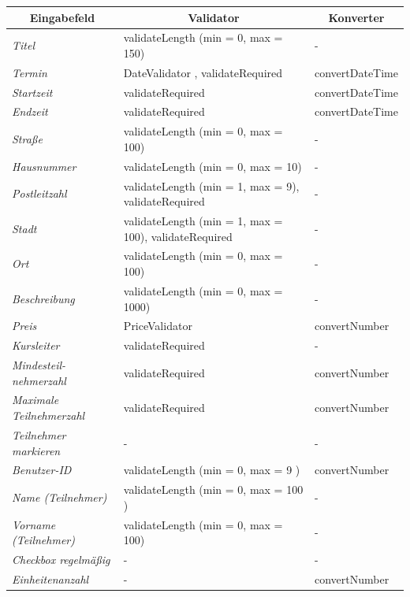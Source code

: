 \begin{itemize}
\begin{center}
\begin{longtable}{|p{3cm} |p{8cm} | p{5cm}|}
						\hline \multicolumn{1}{|c|}{\textbf{Eingabefeld}} & \multicolumn{1}{|c|}{\textbf{Validator}} & \multicolumn{1}{|c|}{\textbf{Konverter}} \\ \hline
						\endfirsthead
						\hline
						\endlastfoot
						\textit{Titel} & validateLength (min = 0, max = 150) & - \\ \hline 
						\textit{Termin} & DateValidator , validateRequired & convertDateTime \\ \hline
						\textit{Startzeit} & validateRequired & convertDateTime \\ \hline
						\textit{Endzeit} & validateRequired & convertDateTime \\ \hline
						\textit{Straße} & validateLength (min = 0, max = 100) & - \\ \hline
						\textit{Hausnummer} & validateLength (min = 0, max = 10) & - \\ \hline
						\textit{Postleitzahl} & validateLength (min = 1, max = 9), validateRequired & - \\ \hline
						\textit{Stadt} & validateLength (min = 1, max = 100), validateRequired & -  \\ \hline
						\textit{Ort} & validateLength (min = 0, max = 100) & -  \\ \hline
						\textit{Beschreibung} & validateLength (min = 0, max = 1000) & - \\ \hline
						\textit{Preis} & PriceValidator  & convertNumber \\ \hline
						\textit{Kursleiter} & validateRequired & -  \\ \hline
						\textit{Mindesteil- nehmerzahl} & validateRequired & convertNumber \\ \hline
						\textit{Maximale Teilnehmerzahl} & validateRequired & convertNumber \\ \hline
						\textit{Teilnehmer markieren} & - & - \\ \hline
						\textit{Benutzer-ID} & validateLength (min = 0, max = 9 ) & convertNumber \\ \hline
						\textit{Name (Teilnehmer)} & validateLength (min = 0, max = 100 ) & - \\ \hline
						\textit{Vorname (Teilnehmer)} & validateLength (min = 0, max = 100) & - \\ \hline
						\textit{Checkbox regelmäßig} & - & - \\ \hline
						\textit{Einheitenanzahl} & - & convertNumber \\ \hline
					\end{longtable}
				\end{center}
				

\end{itemize}
